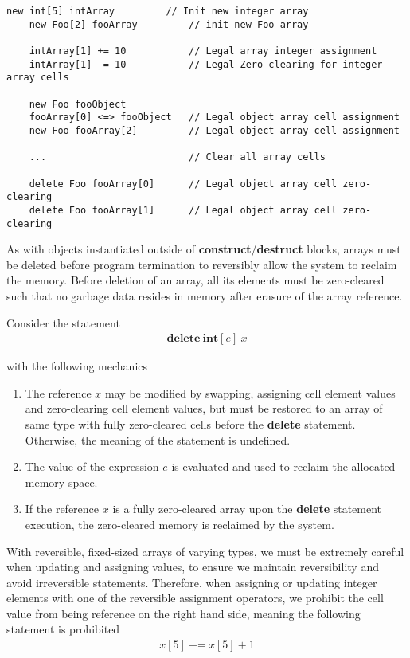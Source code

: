 \begin{lstlisting}[caption={Assignment of array elements}, language=roopl, style=basic,label={lst:array-assignment}]
    new int[5] intArray         // Init new integer array
    new Foo[2] fooArray         // init new Foo array

    intArray[1] += 10           // Legal array integer assignment
    intArray[1] -= 10           // Legal Zero-clearing for integer array cells

    new Foo fooObject
    fooArray[0] <=> fooObject   // Legal object array cell assignment
    new Foo fooArray[2]         // Legal object array cell assignment

    ...                         // Clear all array cells

    delete Foo fooArray[0]      // Legal object array cell zero-clearing
    delete Foo fooArray[1]      // Legal object array cell zero-clearing
\end{lstlisting}
 
As with \rooplpp objects instantiated outside of \textbf{construct}/\textbf{destruct} blocks, arrays must be deleted before program termination to reversibly allow the system to reclaim the memory. Before deletion of an array, all its elements must be zero-cleared such that no garbage data resides in memory after erasure of the array reference.

Consider the statement
\begin{align*}
\textbf{delete}\ \textbf{int}[e]\ x
\end{align*}

with the following mechanics

\begin{enumerate}
\item The reference $x$ may be modified by swapping, assigning cell element values and zero-clearing cell element values, but must be restored to an array of same type with fully zero-cleared cells before the \textbf{delete} statement. Otherwise, the meaning of the statement is undefined.
\item The value of the expression $e$ is evaluated and used to reclaim the allocated memory space. 
\item If the reference $x$ is a fully zero-cleared array upon the \textbf{delete} statement execution, the zero-cleared memory is reclaimed by the system.
\end{enumerate}

With reversible, fixed-sized arrays of varying types, we must be extremely careful when updating and assigning values, to ensure we maintain reversibility and avoid irreversible statements. Therefore, when assigning or updating integer elements with one of the reversible assignment operators, we prohibit the cell value from being reference on the right hand side, meaning the following statement is prohibited
\begin{align*}
x[5]\ \texttt{+=}\ x[5] + 1 
\end{align*}

